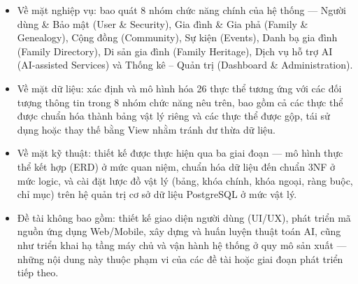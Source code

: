 \begin{itemize}
\item
  Về mặt nghiệp vụ: bao quát 8 nhóm chức năng chính của hệ thống --- Người dùng \& Bảo mật (User \& Security), Gia đình \& Gia phả (Family \& Genealogy), Cộng đồng (Community), Sự kiện (Events), Danh bạ gia đình (Family Directory), Di sản gia đình (Family Heritage), Dịch vụ hỗ trợ AI (AI-assisted Services) và Thống kê -- Quản trị (Dashboard \& Administration).
\item
  Về mặt dữ liệu: xác định và mô hình hóa 26 thực thể tương ứng với các đối tượng thông tin trong 8 nhóm chức năng nêu trên, bao gồm cả các thực thể được chuẩn hóa thành bảng vật lý riêng và các thực thể được gộp, tái sử dụng hoặc thay thế bằng View nhằm tránh dư thừa dữ liệu.
\item
  Về mặt kỹ thuật: thiết kế được thực hiện qua ba giai đoạn --- mô hình thực thể kết hợp (ERD) ở mức quan niệm, chuẩn hóa dữ liệu đến chuẩn 3NF ở mức logic, và cài đặt lược đồ vật lý (bảng, khóa chính, khóa ngoại, ràng buộc, chỉ mục) trên hệ quản trị cơ sở dữ liệu PostgreSQL ở mức vật lý.
\item
  Đề tài không bao gồm: thiết kế giao diện người dùng (UI/UX), phát triển mã nguồn ứng dụng Web/Mobile, xây dựng và huấn luyện thuật toán AI, cũng như triển khai hạ tầng máy chủ và vận hành hệ thống ở quy mô sản xuất --- những nội dung này thuộc phạm vi của các đề tài hoặc giai đoạn phát triển tiếp theo.
\end{itemize}

